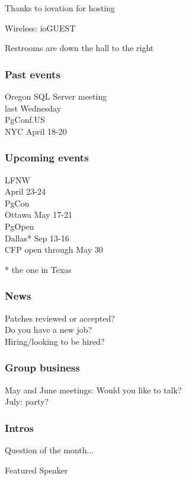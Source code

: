 \documentclass{beamer}
\begin{document}

\frame
{
  \begin{center}
  \item[]Thanks to iovation for hosting
  \item[]Wireless: ioGUEST
  \item[]Restrooms are down the hall to the right
  \end{center}
}

\frame
{
  \frametitle{Past events}
  \begin{center}
{\large Oregon SQL Server meeting\\}
last Wednesday\\
\vspace{5mm}
{\large PgConf.US\\}
NYC April 18-20\\
  \end{center}
}

\frame
{
  \frametitle{Upcoming events}
  \begin{center}
{\large LFNW\\} April 23-24\\
\vspace{5mm}
{\large PgCon\\}
Ottawa May 17-21\\
\vspace{5mm}
{\large PgOpen\\}
Dallas* Sep 13-16\\
CFP open through May 30\\
  \end{center}
  \vspace{10mm}
  * the one in Texas
}

\frame
{
  \frametitle{News}
  \begin{center}
Patches reviewed or accepted?\\
Do you have a new job?\\
Hiring/looking to be hired?\\
  \end{center}
}

\frame
{
  \frametitle{Group business}
  \begin{center}
May and June meetings:  Would you like to talk?\\
July: party?\\
  \end{center}
}

\frame
{
  \frametitle{Intros}
  \begin{center}
{\huge Question of the month...}\\
  \end{center}
}

\frame
{
  \begin{center}
{\huge Featured Speaker}\\
  \end{center}
}
\end{document}
